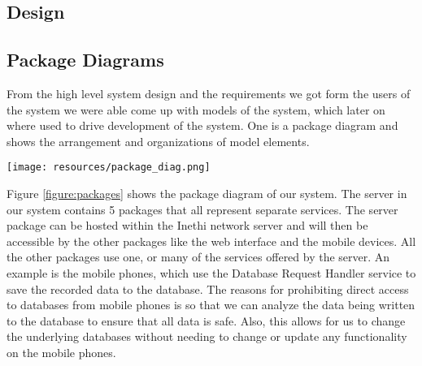 \subsection{Design}\label{subsec:design}
\subsection{Package Diagrams}\label{subsec:package-diagrams}
From the high level system design and the requirements we got form the users of the system we were able come up with models of the system, which later on where used to drive development of the system.
One is a package diagram and shows the arrangement and organizations of model elements.
\begin{figure*}
    \begin{center}
        \texttt{[image: resources/package\_diag.png]}
    \end{center}
    \caption{Showing UML package diagrams of the system.}
    \label{figure:packages}
\end{figure*}
Figure \ref{figure:packages} shows the package diagram of our system.
The server in our system contains 5 packages that all represent separate services.
The server package can be hosted within the Inethi network server and will then be accessible by the other packages like the web interface and the mobile devices.
All the other packages use one, or many of the services offered by the server.
An example is the mobile phones, which use the Database Request Handler service to save the recorded data to the database.
The reasons for prohibiting direct access to databases from mobile phones is so that we can analyze the data being written to the database to ensure that all data is safe.
Also, this allows for us to change the underlying databases without needing to change or update any functionality on the mobile phones.

